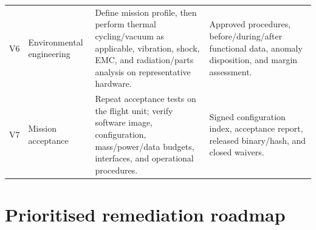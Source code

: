 \documentclass[11pt,a4paper]{article}
\begin{document}
\begin{longtable}{P{0.10\textwidth}P{0.18\textwidth}P{0.30\textwidth}P{0.31\textwidth}}
V6 & Environmental engineering & Define mission profile, then perform thermal cycling/vacuum as applicable, vibration, shock, EMC, and radiation/parts analysis on representative hardware. & Approved procedures, before/during/after functional data, anomaly disposition, and margin assessment.\\
V7 & Mission acceptance & Repeat acceptance tests on the flight unit; verify software image, configuration, mass/power/data budgets, interfaces, and operational procedures. & Signed configuration index, acceptance report, released binary/hash, and closed waivers.\\
\bottomrule
\end{longtable}

\section{Prioritised remediation roadmap}
\label{sec:roadmap}
\end{document}
